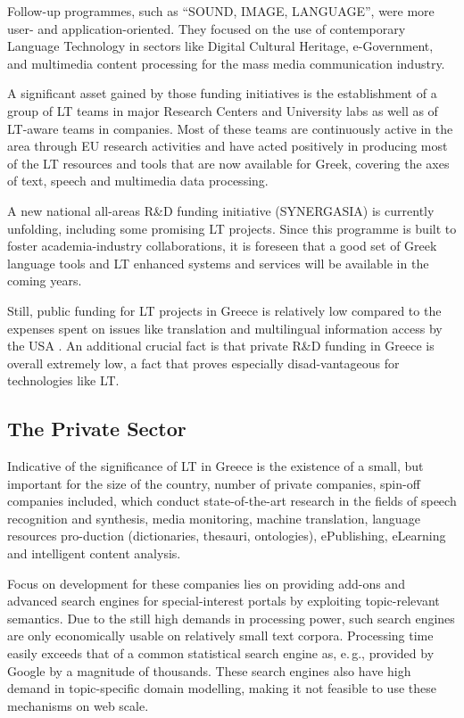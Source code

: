 \documentclass[]{../../metanetpaper}
\begin{document}
\begin{multicols}{2}
Follow-up programmes, such as “SOUND, IMAGE, LANGUAGE”, were more user- and application-oriented. They focused on the use of contemporary Language Technology in sectors like Digital Cultural Heritage, e-Government, and multimedia content processing for the mass media communication industry.

A significant asset gained by those funding initiatives is the establishment of a group of LT teams in major Research Centers and University labs as well as of LT-aware teams in companies. Most of these teams are continuously active in the area through EU research activities and have acted positively in producing most of the LT resources and tools that are now available for Greek, covering the axes of text, speech and multimedia data processing.

A new national all-areas R\&D funding initiative (SYNERGASIA) is currently unfolding, including some promising LT projects. Since this programme is built to foster academia-industry collaborations, it is foreseen that a good set of Greek language tools and LT enhanced systems and services will be available in the coming years.

Still, public funding for LT projects in Greece is relatively low compared to the expenses spent on issues like translation and multilingual information access by the USA \cite{laz2}. An additional crucial fact is that private R\&D funding in Greece is overall extremely low, a fact that proves especially disad-vantageous for technologies like LT.

\subsection{The Private Sector}

Indicative of the significance of LT in Greece is the existence of a small, but important for the size of the country, number of private companies, spin-off companies included, which conduct state-of-the-art research in the fields of speech recognition and synthesis, media monitoring, machine translation, language resources pro-duction (dictionaries, thesauri, ontologies), ePublishing, eLearning and intelligent content analysis.

Focus on development for these companies lies on providing add-ons and advanced search engines for special-interest portals by exploiting topic-relevant semantics. Due to the still high demands in processing power, such search engines are only economically usable on relatively small text corpora. Processing time easily exceeds that of a common statistical search engine as, e.\,g., provided by Google by a magnitude of thousands. These search engines also have high demand in topic-specific domain modelling, making it not feasible to use these mechanisms on web scale.


\end{multicols}
\end{document}
